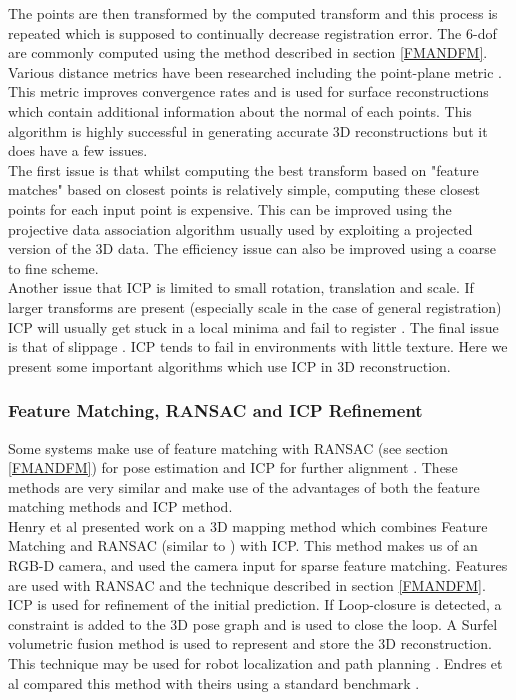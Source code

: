 The points are then transformed by the computed transform and this process is repeated which is supposed to continually decrease registration error. The 6-dof are commonly computed using the method described in section \ref{FMANDFM}. Various distance metrics have been researched including the point-plane metric \cite{Chen92Object}. This metric improves convergence rates and is used for surface reconstructions which contain additional information about the normal of each points. This algorithm is highly successful in generating accurate 3D reconstructions but it does have a few issues. \\

The first issue is that whilst computing the best transform based on "feature matches" based on closest points is relatively simple, computing these closest points for each input point is expensive. This can be improved using the projective data association algorithm \cite{Blais95Registering} usually used by exploiting a projected version of the 3D data. The efficiency issue can also be improved using a coarse to fine scheme. \\

Another issue that ICP is limited to small rotation, translation and scale. If larger transforms are present (especially scale in the case of general registration) ICP will usually get stuck in a local minima and fail to register \cite{Mitra04Registration}. The final issue is that of slippage \cite{Whelan13Robust}. ICP tends to fail in environments with little texture. Here we present some important algorithms which use ICP in 3D reconstruction.

\subsubsection{Feature Matching, RANSAC and ICP Refinement}

Some systems make use of feature matching with RANSAC (see section \ref{FMANDFM}) for pose estimation and ICP for further alignment \cite{Engelhard11Real, Henry10Rgb}. These methods are very similar and make use of the advantages of both the feature matching methods and ICP method. \\

Henry et al \cite{Henry10Rgb} presented work on a 3D mapping method which combines Feature Matching and RANSAC (similar to \cite{Endres12Evaluation}) with ICP. This method makes us of an RGB-D camera, and used the camera input for sparse feature matching. Features are used with RANSAC and the technique described in section \ref{FMANDFM}. ICP is used for refinement of the initial prediction. If Loop-closure is detected, a constraint is added to the 3D pose graph \cite{Kummerle11G} and is used to close the loop. A Surfel \cite{Pfister00Surfels} volumetric fusion method is used to represent and store the 3D reconstruction. This technique may be used for robot localization and path planning \cite{Hornung10Humanoid}. Endres et al \cite{Endres12Evaluation} compared this method with theirs using a standard benchmark \cite{Sturm12Benchmark}.  \\

